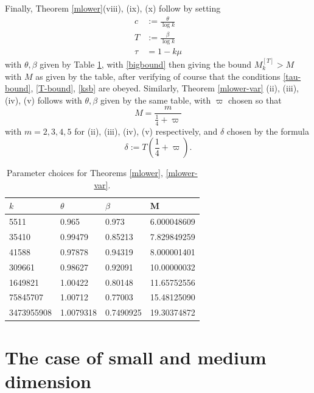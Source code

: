 \documentclass{bmcart}
\theoremstyle{plain}
\theoremstyle{definition}
\begin{document}
Finally, Theorem \ref{mlower}(viii), (ix), (x) follow by setting
\begin{align*}
c &:= \frac{\theta}{\log k} \\
T &:= \frac{\beta}{\log k} \\
\tau &= 1 - k\mu
\end{align*}
with $\theta,\beta$ given by Table \ref{narrow-table}, with \eqref{bigbound} then giving the bound $M_k^{[T]} > M$ with $M$ as given by the table, after verifying of course that the conditions \eqref{tau-bound}, \eqref{T-bound}, \eqref{ksb} are obeyed.  Similarly, Theorem \ref{mlower-var} (ii), (iii), (iv), (v) follows with $\theta,\beta$ given by the same table, with $\varpi$ chosen so that
$$ M = \frac{m}{\frac{1}{4}+\varpi} $$
with $m=2,3,4,5$ for (ii), (iii), (iv), (v) respectively, and $\delta$ chosen by the formula
$$ \delta := T (\frac{1}{4} + \varpi).$$

\begin{table}
\centering
 \caption{Parameter choices for Theorems \ref{mlower}, \ref{mlower-var}.}
 \label{narrow-table}
  \begin{tabular}{llll}
   \toprule
     $k$    & $\theta$   & $\beta$          &M \\
   \midrule
           5511 & 0.965              & 0.973               & 6.000048609 \\ 
          35410 & 0.99479            & 0.85213             & 7.829849259 \\ [0.5ex]
          41588 & 0.97878  	         & 0.94319             & 8.000001401 \\
         309661 & 0.98627            & 0.92091             & 10.00000032 \\ [0.5ex]
				1649821 & 1.00422            & 0.80148             & 11.65752556 \\  
       75845707 & 1.00712            & 0.77003             & 15.48125090 \\  [0.5ex]
     3473955908 & 1.0079318          & 0.7490925           & 19.30374872 \\  
   \bottomrule
  \end{tabular}
\end{table}

\section{The case of small and medium dimension}\label{h1-sec}
\end{document}
